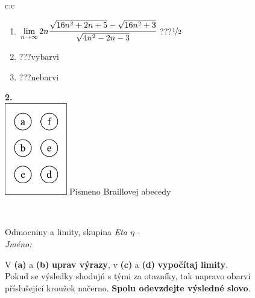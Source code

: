 \documentclass[10pt]{report}
\begin{document}
\begin{tabular}{c:c}
\begin{minipage}[c][104.5mm][t]{0.5\linewidth}
\begin{center}
\begin{minipage}{0.79\linewidth}
\begin{center}
\begin{varwidth}{\linewidth}
\begin{enumerate}
\item $\lim\limits_{n\to\infty}2n\cfrac{\sqrt{16n^2+2n+5}-\sqrt{16n^2+3}}{\sqrt{4n^2-2n-3}}$\quad \dotfill\; ???\;\dotfill \quad $\nicefrac{1}{2}$
\item \quad \dotfill\; ???\;\dotfill \quad vybarvi
\item \quad \dotfill\; ???\;\dotfill \quad nebarvi
\end{enumerate}
\end{varwidth}
\end{center}
\end{minipage}
\begin{minipage}{0.20\linewidth}
\begin{center}
{\Huge\bfseries 2.} \\[2mm]
\includegraphics[height=40mm]{../images/braille.png}
{\small Písmeno Braillovej abecedy}
\end{center}
\end{minipage}
\end{center}
\end{minipage}
\\ \hdashline
\begin{minipage}[c][104.5mm][t]{0.5\linewidth}
\begin{center}
\vspace{7mm}
{\huge Odmocniny a limity, skupina \textit{Eta $\eta$} -}\\[5mm]
\textit{Jméno:}\phantom{xxxxxxxxxxxxxxxxxxxxxxxxxxxxxxxxxxxxxxxxxxxxxxxxxxxxxxxxxxxxxxxxx}\\[5mm]
\begin{minipage}{0.95\linewidth}
\begin{center}
V \textbf{(a)} a \textbf{(b)} \textbf{uprav výrazy}, v \textbf{(c)} a \textbf{(d)} \textbf{vypočítaj limity}.\\Pokud se výsledky shodujú s tými za otazníky, tak napravo obarvi\\příslušející kroužek načerno. \textbf{Spolu odevzdejte výsledné slovo}.
\end{center}
\end{minipage}
\\[1mm]

\end{center}
\end{minipage}
\end{tabular}
\end{document}
